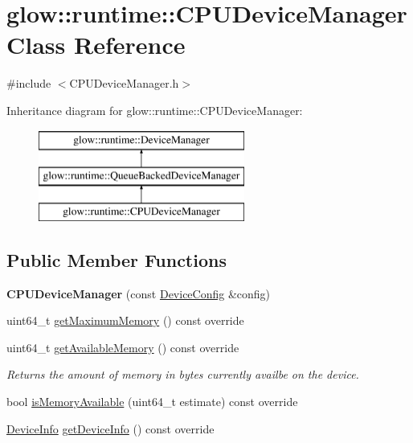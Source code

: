 \hypertarget{classglow_1_1runtime_1_1_c_p_u_device_manager}{}\section{glow\+:\+:runtime\+:\+:C\+P\+U\+Device\+Manager Class Reference}
\label{classglow_1_1runtime_1_1_c_p_u_device_manager}


{\ttfamily \#include $<$C\+P\+U\+Device\+Manager.\+h$>$}

Inheritance diagram for glow\+:\+:runtime\+:\+:C\+P\+U\+Device\+Manager\+:\begin{figure}[H]
\begin{center}
\leavevmode
\includegraphics[height=3.000000cm]{classglow_1_1runtime_1_1_c_p_u_device_manager}
\end{center}
\end{figure}
\subsection*{Public Member Functions}
\begin{DoxyCompactItemize}
\item 
\mbox{\label{classglow_1_1runtime_1_1_c_p_u_device_manager_a2071d647e763eab734bae8ea5f6ea97c}} 
{\bfseries C\+P\+U\+Device\+Manager} (const \hyperlink{structglow_1_1runtime_1_1_device_config}{Device\+Config} \&config)
\item 
uint64\+\_\+t \hyperlink{classglow_1_1runtime_1_1_c_p_u_device_manager_a865758926a01983e4867ce0c2583ec3a}{get\+Maximum\+Memory} () const override
\item 
\mbox{\label{classglow_1_1runtime_1_1_c_p_u_device_manager_a652125a46bce98a6b08cfb9907b03b26}} 
uint64\+\_\+t \hyperlink{classglow_1_1runtime_1_1_c_p_u_device_manager_a652125a46bce98a6b08cfb9907b03b26}{get\+Available\+Memory} () const override
\begin{DoxyCompactList}\small\item\em Returns the amount of memory in bytes currently availbe on the device. \end{DoxyCompactList}\item 
bool \hyperlink{classglow_1_1runtime_1_1_c_p_u_device_manager_a61e188ea68529ec4a4037e7df81f98f8}{is\+Memory\+Available} (uint64\+\_\+t estimate) const override
\item 
\hyperlink{structglow_1_1runtime_1_1_device_info}{Device\+Info} \hyperlink{classglow_1_1runtime_1_1_c_p_u_device_manager_af2ab7f66e45a81dd9fe1f2ad4054bc6c}{get\+Device\+Info} () const override
\end{DoxyCompactItemize}
